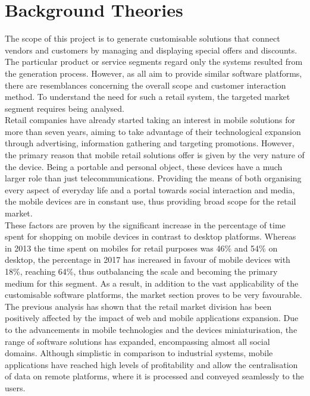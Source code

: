 \section{Background Theories}

The scope of this project is to generate customisable solutions that connect vendors and customers by managing and displaying special offers and discounts. The particular product or service segments regard only the systems resulted from the generation process. However, as all aim to provide similar software platforms, there are resemblances concerning the overall scope and customer interaction method. To understand the need for such a retail system, the targeted market segment requires being analysed.\\

Retail companies have already started taking an interest in mobile solutions for more than seven years, aiming to take advantage of their technological expansion through advertising, information gathering and targeting promotions\cite{GREWAL2011S43}. However, the primary reason that mobile retail solutions offer is given by the very nature of the device. Being a portable and personal object, these devices have a much larger role than just telecommunications. Providing the means of both organising every aspect of everyday life and a portal towards social interaction and media, the mobile devices are in constant use, thus providing broad scope for the retail market\cite{SHANKAR2010111}.\\

These factors are proven by the significant increase in the percentage of time spent for shopping on mobile devices in contrast to desktop platforms. Whereas in 2013 the time spent on mobiles for retail purposes was 46\% and 54\% on desktop\cite{statistic_2017}, the percentage in 2017 has increased in favour of mobile devices with 18\%, reaching 64\%\cite{richter_2017}, thus outbalancing the scale and becoming the primary medium for this segment. As a result, in addition to the vast applicability of the customisable software platforms, the market section proves to be very favourable.\\

The previous analysis has shown that the retail market division has been positively affected by the impact of web and mobile applications expansion. Due to the advancements in mobile technologies and the devices miniaturisation, the range of software solutions has expanded, encompassing almost all social domains. Although simplistic in comparison to industrial systems, mobile applications have reached high levels of profitability and allow the centralisation of data on remote platforms, where it is processed and conveyed seamlessly to the users.\\

